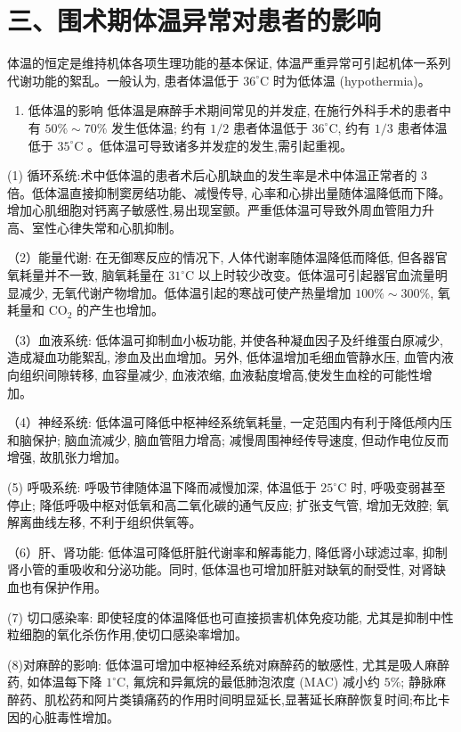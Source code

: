 \documentclass[10pt]{article}
\begin{document}
\section*{三、围术期体温异常对患者的影响}
体温的恒定是维持机体各项生理功能的基本保证, 体温严重异常可引起机体一系列代谢功能的絮乱。一般认为, 患者体温低于 $36^{\circ} \mathrm{C}$ 时为低体温 (hypothermia)。

\begin{enumerate}
  \item 低体温的影响 低体温是麻醉手术期间常见的并发症, 在施行外科手术的患者中有 $50 \% \sim 70 \%$ 发生低体温; 约有 $1 / 2$ 患者体温低于 $36^{\circ} \mathrm{C}$, 约有 $1 / 3$ 患者体温低于 $35^{\circ} \mathrm{C}$ 。低体温可导致诸多并发症的发生,需引起重视。
\end{enumerate}

(1) 循环系统:术中低体温的患者术后心肌缺血的发生率是术中体温正常者的 3 倍。低体温直接抑制窦房结功能、减慢传导, 心率和心排出量随体温降低而下降。增加心肌细胞对钙离子敏感性,易出现室颤。严重低体温可导致外周血管阻力升高、室性心律失常和心肌抑制。

（2）能量代谢: 在无御寒反应的情况下, 人体代谢率随体温降低而降低, 但各器官氧耗量并不一致, 脑氧耗量在 $31^{\circ} \mathrm{C}$ 以上时较少改变。低体温可引起器官血流量明显减少, 无氧代谢产物增加。低体温引起的寒战可使产热量增加 $100 \% \sim 300 \%$, 氧耗量和 $\mathrm{CO}_{2}$ 的产生也增加。

（3）血液系统: 低体温可抑制血小板功能, 并使各种凝血因子及纤维蛋白原减少, 造成凝血功能絮乱, 渗血及出血增加。另外, 低体温增加毛细血管静水压, 血管内液向组织间隙转移, 血容量减少, 血液浓缩, 血液黏度增高,使发生血栓的可能性增加。

（4）神经系统: 低体温可降低中枢神经系统氧耗量, 一定范围内有利于降低颅内压和脑保护; 脑血流减少, 脑血管阻力增高; 减慢周围神经传导速度, 但动作电位反而增强, 故肌张力增加。

(5) 呼吸系统: 呼吸节律随体温下降而减慢加深, 体温低于 $25^{\circ} \mathrm{C}$ 时, 呼吸变弱甚至停止; 降低呼吸中枢对低氧和高二氧化碳的通气反应; 扩张支气管, 增加无效腔; 氧解离曲线左移, 不利于组织供氧等。

（6）肝、肾功能: 低体温可降低肝脏代谢率和解毒能力, 降低肾小球滤过率, 抑制肾小管的重吸收和分泌功能。同时, 低体温也可增加肝脏对缺氧的耐受性, 对肾缺血也有保护作用。

(7) 切口感染率: 即使轻度的体温降低也可直接损害机体免疫功能, 尤其是抑制中性粒细胞的氧化杀伤作用,使切口感染率增加。

(8)对麻醉的影响: 低体温可增加中枢神经系统对麻醉药的敏感性, 尤其是吸人麻醉药, 如体温每下降 $1^{\circ} \mathrm{C}$, 氟烷和异氟烷的最低肺泡浓度 (MAC) 减小约 $5 \%$; 静脉麻醉药、肌松药和阿片类镇痛药的作用时间明显延长,显著延长麻醉恢复时间;布比卡因的心脏毒性增加。
\end{document}
